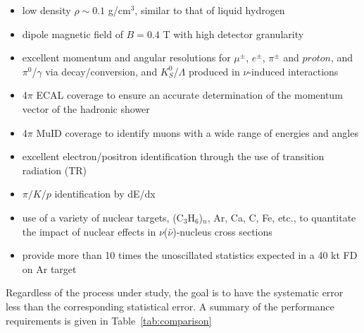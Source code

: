 \begin{itemize}
\item low density $\rho \sim 0.1$ g/cm$^3$, similar to that of liquid hydrogen

\item dipole magnetic field of $B=0.4$ T with high detector granularity 

\item excellent momentum and angular resolutions for $\mu^{\pm}$, $e^{\pm}$, 
$\pi^{\pm}$ and $proton$, and $\pi^0$/$\gamma$ via decay/conversion, 
 and $K^0_S$/$\Lambda$ produced in $\nu$-induced interactions

\item 4$\pi$ ECAL coverage to ensure an  
 accurate determination of the momentum vector of the hadronic shower

\item 4$\pi$ MuID coverage to identify muons with a wide range of energies and angles  

\item excellent electron/positron identification through the use of transition radiation (TR) 

\item $\pi/K/p$ identification by dE/dx 

\item use of a variety of nuclear targets, (C$_3$H$_6$)$_n$, Ar, Ca, C, Fe, etc., to quantitate the impact of nuclear 
effects in $\nu$($\bar \nu$)-nucleus cross sections  

\item provide more than 10 times the unoscillated statistics expected in a 40 kt FD on Ar target

\end{itemize}
Regardless of the process under study, the goal is
to have the systematic error less than the corresponding statistical error. A summary of the performance
requirements is given in Table~\ref{tab:comparison}


